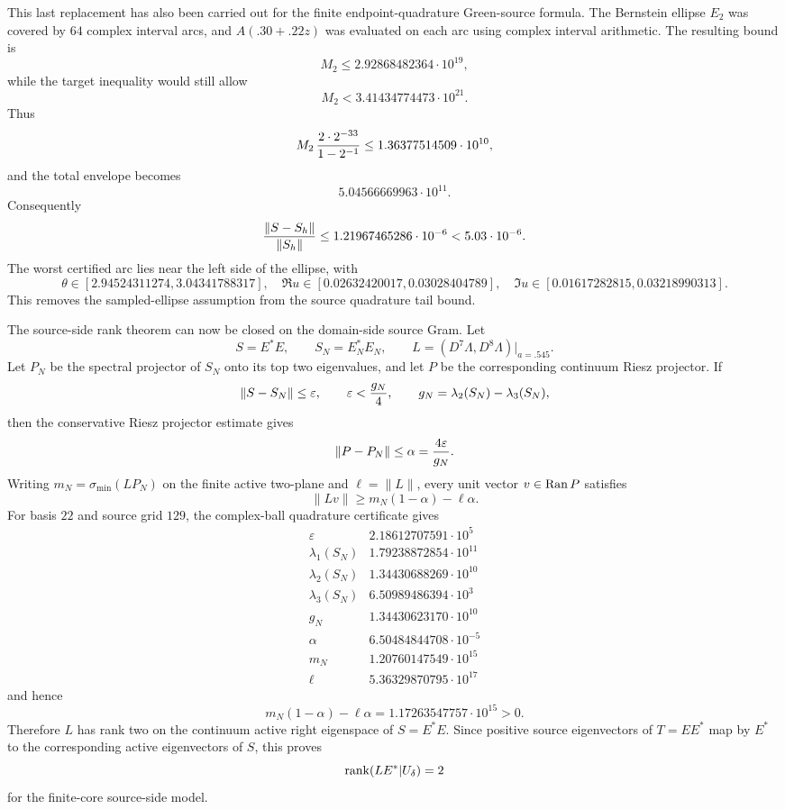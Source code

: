 \documentclass[11pt]{article}
\begin{document}
This last replacement has also been carried out for the finite
endpoint-quadrature Green-source formula.  The Bernstein ellipse \(E_2\) was
covered by \(64\) complex interval arcs, and \(A(.30+.22z)\) was evaluated on
each arc using complex interval arithmetic.  The resulting bound is
\[
  M_2\le 2.92868482364\cdot10^{19},
\]
while the target inequality would still allow
\[
  M_2<3.41434774473\cdot10^{21}.
\]
Thus
\[
  M_2\,{2\cdot2^{-33}\over1-2^{-1}}
  \le1.36377514509\cdot10^{10},
\]
and the total envelope becomes
\[
  5.04566669963\cdot10^{11}.
\]
Consequently
\[
  {\|S-S_h\|\over\|S_h\|}
  \le1.21967465286\cdot10^{-6}<5.03\cdot10^{-6}.
\]
The worst certified arc lies near the left side of the ellipse, with
\[
  \theta\in[2.94524311274,3.04341788317],\quad
  \Re u\in[0.02632420017,0.03028404789],\quad
  \Im u\in[0.01617282815,0.03218990313].
\]
This removes the sampled-ellipse assumption from the source quadrature tail
bound.

The source-side rank theorem can now be closed on the domain-side source Gram.
Let
\[
  S=E^\ast E,\qquad S_N=E_N^\ast E_N,\qquad
  L=(D^7\Lambda,D^8\Lambda)|_{a=.545}.
\]
Let \(P_N\) be the spectral projector of \(S_N\) onto its top two eigenvalues,
and let \(P\) be the corresponding continuum Riesz projector.  If
\[
  \|S-S_N\|\le \varepsilon,\qquad
  \varepsilon< {g_N\over4},\qquad
  g_N=\lambda_2(S_N)-\lambda_3(S_N),
\]
then the conservative Riesz projector estimate gives
\[
  \|P-P_N\|\le \alpha={4\varepsilon\over g_N}.
\]
Writing \(m_N=\sigma_{\min}(LP_N)\) on the finite active two-plane and
\(\ell=\|L\|\), every unit vector \(v\in{\rm Ran}\,P\) satisfies
\[
  \|Lv\|\ge m_N(1-\alpha)-\ell\alpha.
\]
For basis \(22\) and source grid \(129\), the complex-ball quadrature
certificate gives
\[
\begin{array}{c|c}
\varepsilon&2.18612707591\cdot10^5\\
\lambda_1(S_N)&1.79238872854\cdot10^{11}\\
\lambda_2(S_N)&1.34430688269\cdot10^{10}\\
\lambda_3(S_N)&6.50989486394\cdot10^3\\
g_N&1.34430623170\cdot10^{10}\\
\alpha&6.50484844708\cdot10^{-5}\\
m_N&1.20760147549\cdot10^{15}\\
\ell&5.36329870795\cdot10^{17}
\end{array}
\]
and hence
\[
  m_N(1-\alpha)-\ell\alpha
  =1.17263547757\cdot10^{15}>0.
\]
Therefore \(L\) has rank two on the continuum active right eigenspace of
\(S=E^\ast E\).  Since positive source eigenvectors of \(T=EE^\ast\) map by
\(E^\ast\) to the corresponding active eigenvectors of \(S\), this proves
\[
  {\rm rank}(LE^\ast|U_\delta)=2
\]
for the finite-core source-side model.
\end{document}
